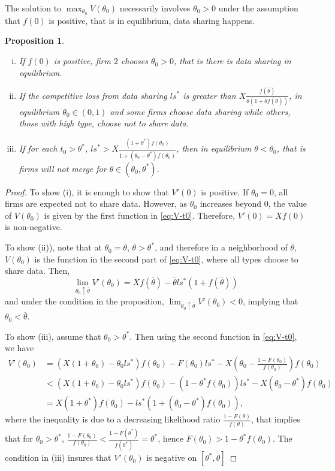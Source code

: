 \documentclass[a4paper]{article}
\newtheorem{prop}{Proposition}
\renewcommand{\t}{\theta}
\begin{document}
%
The solution to $\max_{\t_0} V(\t_0)$ necessarily involves $\t_0>0$ under the assumption that $f(0)$ is positive, that is in equilibrium, data sharing happens.
\begin{prop}
  \begin{enumerate}[(i)]\setlength\itemsep{0em}
    \item If $f(0)$ is positive, firm $2$ chooses $\t_0>0$, that is there is data sharing in equilibrium. 
    \item If the competitive loss from data sharing $l s^*$ is greater than $X\frac{f(\overline \t)}{\overline \t(1+\t f(\overline \t))}$, in equilibrium $\t_0\in (0,1)$ and some firms choose data sharing while others, those with high type, choose not to share data.
    \item If for each $t_0>\t^*$, $ls^*>X\frac{(1+\t^*)f(\t_0)}{1+(\t_0-\t^*)f(\t_0)}$, then in equilibrium $\t<\t_0$, that is firms will not merge for $\t\in (\t_0,\t^*)$.
  \end{enumerate}
\end{prop}
\begin{proof}
  To show (i), it is enough to show that $V'(0)$ is positive. If $\t_0=0$, all firms are expected not to share data. However, as $\theta_0$ increases beyond $0$, the value of $V(\t_0)$ is given by the first function in \eqref{eq:V-t0}. Therefore, $V'(0)=Xf(0)$ is non-negative.

  To show (ii)), note that at $\t_0=\overline \t$, $\overline \t>\t^*$, and therefore in a neighborhood of $\overline \t$, $V(\t_0)$ is the function in the second part of \eqref{eq:V-t0}, where all types choose to share data. Then, 
  \[
    \lim_{\t_0\uparrow \overline \t}V'(\t_0)=Xf(\overline \t)-\overline \t ls^*(1+ f(\overline \t))
 \]
and under the condition in the proposition, $\lim_{\t_0\uparrow \overline \t}V'(\t_0)<0$, implying that $\t_0<\overline \t$.

To show (iii), assume that $\t_0>\t^*$. Then using the second function in \eqref{eq:V-t0}, we have
\begin{align*}
  V'(\t_0)&=(X(1+\t_0)-\t_0ls^*)f(\t_0)-F(\t_0)l s^*- X\left(\t_0-\frac{1-F(\t_0)}{f(\t_0)}\right)f(\t_0)\\ 
  &<(X(1+\t_0)-\t_0ls^*)f(\t_0)- (1-\t^* f(\t_0)) l s^*- X\left(\t_0-\t^*\right)f(\t_0)\\ 
  &=X(1+\t^*)f(\t_0)-ls^*(1+(\t_0-\t^*)f(\t_0)),
\end{align*}
  where the inequality is due to a decreasing likelihood ratio $\frac{1-F(\t)}{f(\t)}$, that implies that for $\t_0>\t^*$,  $\frac{1-F(\t_0)}{f(\t_0)}<\frac{1-F(\t^*)}{f(\t^*)}=\t^*$, hence $F(\t_0)>1-\t^*f(\t_0)$. The condition in (iii) insures that $V'(\t_0)$ is negative on $[\t^*,\overline \t]$
\end{proof}
\end{document}
